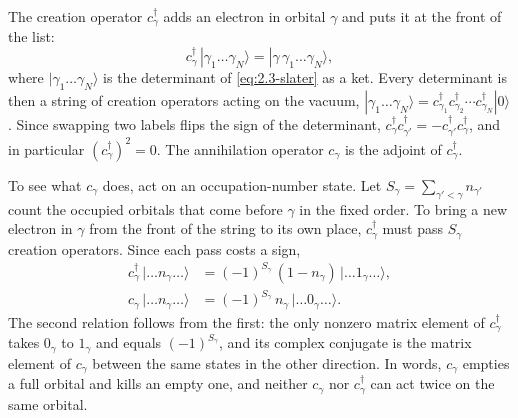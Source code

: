The creation operator $c^\dagger_\gamma$ adds an electron in orbital $\gamma$ and puts it at the front of the list:
\begin{equation}
  c^\dagger_\gamma\,|\gamma_1\dots\gamma_N\rangle = |\gamma\,\gamma_1\dots\gamma_N\rangle ,
  \label{eq:2.3-cdag}
\end{equation}
where $|\gamma_1\dots\gamma_N\rangle$ is the determinant of \cref{eq:2.3-slater} as a ket. Every determinant is then a string of creation operators acting on the vacuum, $|\gamma_1\dots\gamma_N\rangle = c^\dagger_{\gamma_1}c^\dagger_{\gamma_2}\cdots c^\dagger_{\gamma_N}|0\rangle$. Since swapping two labels flips the sign of the determinant, $c^\dagger_\gamma c^\dagger_{\gamma'} = -c^\dagger_{\gamma'}c^\dagger_\gamma$, and in particular $(c^\dagger_\gamma)^2 = 0$. The annihilation operator $c_\gamma$ is the adjoint of $c^\dagger_\gamma$.

To see what $c_\gamma$ does, act on an occupation-number state. Let $S_\gamma = \sum_{\gamma' < \gamma}n_{\gamma'}$ count the occupied orbitals that come before $\gamma$ in the fixed order. To bring a new electron in $\gamma$ from the front of the string to its own place, $c^\dagger_\gamma$ must pass $S_\gamma$ creation operators. Since each pass costs a sign,
\begin{equation}
\begin{aligned}
  c^\dagger_\gamma\,|\dots n_\gamma\dots\rangle &= (-1)^{S_\gamma}\,(1 - n_\gamma)\,|\dots 1_\gamma\dots\rangle,\\
  c_\gamma\,|\dots n_\gamma\dots\rangle &= (-1)^{S_\gamma}\,n_\gamma\,|\dots 0_\gamma\dots\rangle .
\end{aligned}
  \label{eq:2.3-action}
\end{equation}
The second relation follows from the first: the only nonzero matrix element of $c^\dagger_\gamma$ takes $0_\gamma$ to $1_\gamma$ and equals $(-1)^{S_\gamma}$, and its complex conjugate is the matrix element of $c_\gamma$ between the same states in the other direction. In words, $c_\gamma$ empties a full orbital and kills an empty one, and neither $c_\gamma$ nor $c^\dagger_\gamma$ can act twice on the same orbital.

